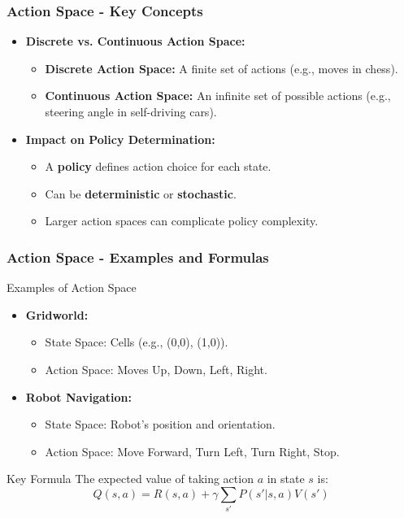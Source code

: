 \documentclass[aspectratio=169]{beamer}
\begin{document}
\begin{frame}[fragile]
    \frametitle{Action Space - Key Concepts}
    \begin{itemize}
        \item \textbf{Discrete vs. Continuous Action Space:}
            \begin{itemize}
                \item \textbf{Discrete Action Space:} A finite set of actions (e.g., moves in chess).
                \item \textbf{Continuous Action Space:} An infinite set of possible actions (e.g., steering angle in self-driving cars).
            \end{itemize}
        \item \textbf{Impact on Policy Determination:}
            \begin{itemize}
                \item A \textbf{policy} defines action choice for each state.
                \item Can be \textbf{deterministic} or \textbf{stochastic}.
                \item Larger action spaces can complicate policy complexity.
            \end{itemize}
    \end{itemize}
\end{frame}

\begin{frame}[fragile]
    \frametitle{Action Space - Examples and Formulas}
    \begin{block}{Examples of Action Space}
        \begin{itemize}
            \item \textbf{Gridworld:} 
                \begin{itemize}
                    \item State Space: Cells (e.g., (0,0), (1,0)).
                    \item Action Space: Moves {Up, Down, Left, Right}.
                \end{itemize}
            \item \textbf{Robot Navigation:} 
                \begin{itemize}
                    \item State Space: Robot's position and orientation.
                    \item Action Space: {Move Forward, Turn Left, Turn Right, Stop}.
                \end{itemize}
        \end{itemize}
    \end{block}
    
    \begin{block}{Key Formula}
        The expected value of taking action \(a\) in state \(s\) is:
        \begin{equation}
            Q(s, a) = R(s, a) + \gamma \sum_{s'} P(s' | s, a) V(s')
        \end{equation}
    \end{block}
\end{frame}
\end{document}
